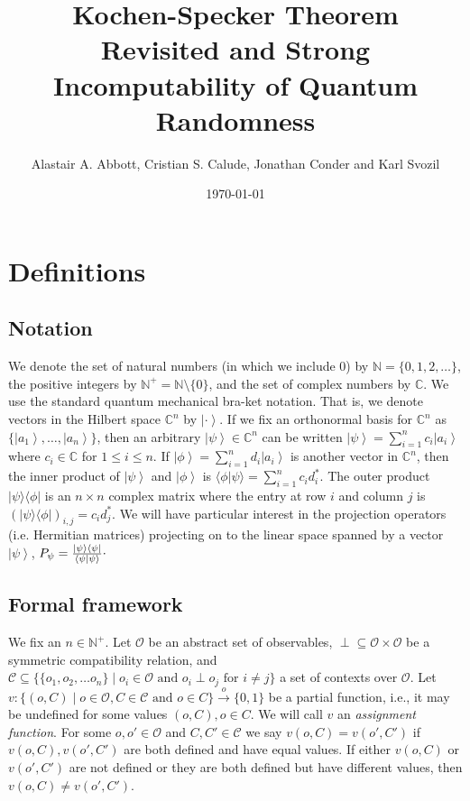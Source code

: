 \documentclass[11pt, a4paper]{article}
\title{Kochen-Specker Theorem Revisited and Strong Incomputability of Quantum Randomness}
\author{Alastair A. Abbott, Cristian S. Calude, Jonathan Conder and Karl Svozil}
\date{\today}
\theoremstyle{definition}
\newcommand{\ket}[1]{\left| #1 \right>}
\newcommand{\iprod}[2]{\langle #1 | #2 \rangle}
\newcommand{\oprod}[2]{| #1 \rangle\langle #2 |}
\begin{document}
\maketitle

\section{Definitions}%

\subsection{Notation}

We denote the set of natural numbers (in which we include 0) by $\mathbb{N}=\{0,1,2,\dots\}$, the positive integers by $\mathbb{N}^+=\mathbb{N}\setminus\{0\}$, and the set of complex numbers by $\mathbb{C}$.
We use the standard quantum mechanical bra-ket notation.
That is, we denote vectors in the Hilbert space $\mathbb{C}^n$ by $\ket{\cdot}$.
If we fix an orthonormal basis for $\mathbb{C}^n$ as $\{\ket{a_1},\dots,\ket{a_n}\}$, then an arbitrary $\ket{\psi}\in\mathbb{C}^n$ can be written $\ket{\psi}=\sum_{i=1}^n c_i\ket{a_i}$ where $c_i\in \mathbb{C}$ for $1\le i \le n$.
If $\ket{\phi}=\sum_{i=1}^n d_i\ket{a_i}$ is another vector in $\mathbb{C}^n$, then the inner product of $\ket{\psi}$ and $\ket{\phi}$ is $\iprod{\phi}{\psi}=\sum_{i=1}^n c_i d_i^*$.
The outer product $\oprod{\psi}{\phi}$ is an $n\times n$ complex  matrix where the entry at row $i$ and column $j$ is $(\oprod{\psi}{\phi})_{i,j}=c_i d_j^*$.
We will have particular interest in the projection operators (i.e. Hermitian matrices) projecting on to the linear space spanned by a vector $\ket{\psi}$, $P_\psi=\frac{\oprod{\psi}{\psi}}{\iprod{\psi}{\psi}}\raisebox{.8mm}{.}$

\subsection{Formal framework}
We fix an $n\in\mathbb{N}^+$.
Let $\mathcal{O}$ be an abstract set of observables, $\perp\subseteq\mathcal{O}\times \mathcal{O}$ be a symmetric compatibility relation, and $\mathcal{C}\subseteq \{\{o_1,o_2,\dots o_n\} \mid o_i \in \mathcal{O} \text{ and } o_i\perp o_j \text{ for } i\neq j \}$ a set of contexts over $\mathcal{O}$.
	Let $v : \{(o,C) \mid o\in \mathcal{O}, C\in\mathcal{C}\text{ and } o\in C \} \xrightarrow{o} \{0,1\}$ be a partial function, i.e., it may be undefined for some values $(o,C),o\in C$. We will call $v$ an \emph{assignment function}. For some $o,o'\in \mathcal{O}$ and $C,C'\in\mathcal{C}$ we say $v(o,C)=v(o',C')$ if $v(o,C),v(o',C')$ are both defined and have equal values. If either $v(o,C)$ or $v(o',C')$ are not defined or they are both defined but have different values, then $v(o,C)\neq v(o',C')$.
\\
\end{document}

